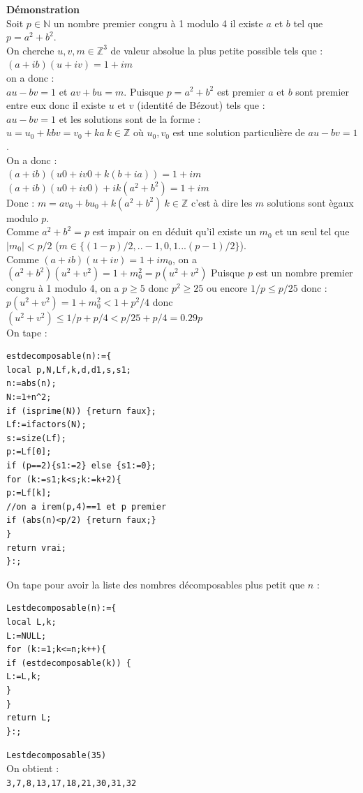 \documentclass[a4paper,11pt]{book}
\newcommand{\Z}{{\mathbb{Z}}}
\newcommand{\N}{{\mathbb{N}}}
\begin{document}
\begin{itemize}
{\bf D\'emonstration}\\
Soit $p\in \N$ un nombre premier congru \`a 1 modulo 4 il existe $a$ et $b$ 
tel que $p=a^2+b^2$.\\
On cherche $u, v,m \in \Z^3$ de valeur absolue la plus petite possible tels 
que :  \\
$(a+ib)(u+iv)=1+im$\\
on a donc :\\
$au-bv=1$ et $av+bu=m$.
Puisque $p=a^2+b^2$ est premier $a$ et $b$ sont premier entre eux donc il 
existe $u$ et $v$ (identit\'e de B\'ezout) tels que :\\
$au-bv=1$ et les solutions sont de la forme :\\
$u=u_0+kb v=v_0+ka \ k\in \Z$ o\`u $u_0,v_0$ est une solution 
particuli\`ere de $au-bv=1$.\\
On a donc :\\
$(a+ib)(u0+iv0+k(b+ia))=1+im$\\
$(a+ib)(u0+iv0)+ik(a^2+b^2)=1+im$\\
Donc  : $m=av_0+bu_0+k(a^2+b^2) \ k\in \Z$ c'est \`a dire les $m$ solutions 
sont \`egaux modulo $p$.\\
Comme $a^2+b^2=p$ est impair on en d\'eduit qu'il existe un $m_0$ et un seul 
tel que $|m_0|<p/2$ ($m \in \{(1-p)/2,..-1,0,1... (p-1)/2 \}$).\\
Comme $(a+ib)(u+iv)=1+im_0$, on a $(a^2+b^2)(u^2+v^2)=1+m_0^2=p(u^2+v^2)$
Puisque $p$ est un nombre premier  congru \`a 1 modulo 4, on a $p\geq 5$ donc
$p^2\geq 25$ ou encore $1/p\leq p/25$ donc :\\
$p(u^2+v^2)=1+m_0^2<1+p^2/4$  donc \\
$(u^2+v^2)\leq 1/p+p/4<p/25+p/4=0.29p$\\
On tape :
\begin{verbatim}
estdecomposable(n):={
local p,N,Lf,k,d,d1,s,s1;
n:=abs(n);
N:=1+n^2;
if (isprime(N)) {return faux};
Lf:=ifactors(N);
s:=size(Lf);
p:=Lf[0];
if (p==2){s1:=2} else {s1:=0};
for (k:=s1;k<s;k:=k+2){
p:=Lf[k];
//on a irem(p,4)==1 et p premier
if (abs(n)<p/2) {return faux;}
}
return vrai;
}:;
\end{verbatim} 
\end{itemize}
On tape pour avoir la liste des nombres d\'ecomposables plus petit que $n$ :
\begin{verbatim}
Lestdecomposable(n):={
local L,k;
L:=NULL;
for (k:=1;k<=n;k++){
if (estdecomposable(k)) {
L:=L,k;
}
}
return L;
}:;
\end{verbatim} 
{\tt Lestdecomposable(35)}\\
On obtient :\\
{\tt 3,7,8,13,17,18,21,30,31,32}
\end{document}
